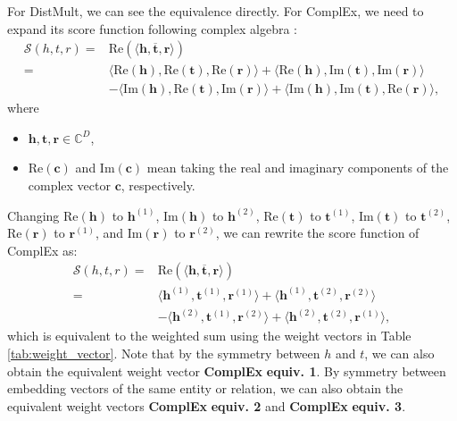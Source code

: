 \documentclass[sigconf,edbt]{acmart-edbt2019}
\def\vc{{\bm{c}}}
\def\vh{{\bm{h}}}
\def\vr{{\bm{r}}}
\def\vt{{\bm{t}}}
\def\gS{{\mathcal{S}}}
\def\sC{{\mathbb{C}}}
\begin{document}
For DistMult, we can see the equivalence directly. For ComplEx, we need to expand its score function following complex algebra \cite{ahlfors_complexanalysisintroduction_1953}:
\begin{equation} \label{eq:complex_expand}
\begin{split}
\gS(h,t,r) = &\text{Re}(\langle \vh, \overline{\vt}, \vr \rangle)\\
= &\langle \text{Re}(\vh), \text{Re}(\vt), \text{Re}(\vr) \rangle + \langle \text{Re}(\vh), \text{Im}(\vt), \text{Im}(\vr) \rangle\\
&- \langle \text{Im}(\vh), \text{Re}(\vt), \text{Im}(\vr) \rangle + \langle \text{Im}(\vh), \text{Im}(\vt), \text{Re}(\vr) \rangle,
\end{split}
\end{equation}
where 
\begin{itemize}
	\item $ \vh, \vt, \vr \in \sC^{D} $,
	\item Re$ (\vc) $ and Im$ (\vc) $ mean taking the real and imaginary components of the complex vector $ \vc $, respectively.
\end{itemize}

Changing Re$ (\vh) $ to $ \vh^{(1)} $, Im$ (\vh) $ to $ \vh^{(2)} $, Re$ (\vt) $ to $ \vt^{(1)} $, Im$ (\vt) $ to $ \vt^{(2)} $, Re$ (\vr) $ to $ \vr^{(1)} $, and Im$ (\vr) $ to $ \vr^{(2)} $, we can rewrite the score function of ComplEx as:
\begin{equation} \label{eq:complex_expand_multiemb}
\begin{split}
\gS(h,t,r) = &\text{Re}(\langle \vh, \overline{\vt}, \vr \rangle)\\
= &\langle \vh^{(1)}, \vt^{(1)}, \vr^{(1)} \rangle + \langle \vh^{(1)}, \vt^{(2)}, \vr^{(2)} \rangle\\
&- \langle \vh^{(2)}, \vt^{(1)}, \vr^{(2)} \rangle + \langle \vh^{(2)}, \vt^{(2)}, \vr^{(1)} \rangle,
\end{split}
\end{equation}
which is equivalent to the weighted sum using the weight vectors in Table \ref{tab:weight_vector}. Note that by the symmetry between $ h $ and $ t $, we can also obtain the equivalent weight vector \textbf{ComplEx} \textbf{equiv. 1}. By symmetry between embedding vectors of the same entity or relation, we can also obtain the equivalent weight vectors \textbf{ComplEx} \textbf{equiv. 2} and \textbf{ComplEx} \textbf{equiv. 3}.
\end{document}
